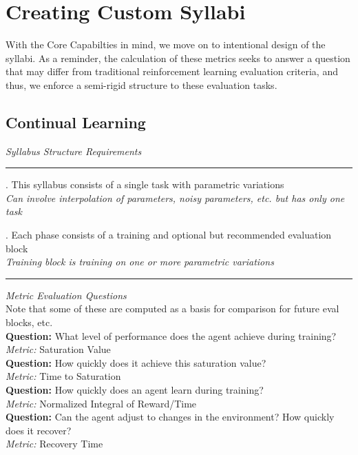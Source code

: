 \chapter{Creating Custom Syllabi}\label{ch:custom_syllabi}

With the Core Capabilties in mind, we move on to intentional design of the syllabi. As a reminder, the calculation of these metrics seeks to answer a question that may differ from traditional reinforcement learning evaluation criteria, and thus, we enforce a semi-rigid structure to these evaluation tasks.

\section{Continual Learning}    
\textit{Syllabus Structure Requirements}\\
\noindent\rule{8cm}{0.4pt}
. This syllabus consists of a single task with parametric variations\\
\textit{Can involve interpolation of parameters, noisy parameters, etc. but has only one task \\}


. Each phase consists of a training and optional but recommended evaluation block\\
\textit{Training block is training on one or more parametric variations \\}
\noindent\rule{8cm}{0.4pt}

\flushleft\textit{Metric Evaluation Questions}\\[0.1in]

Note that some of these are computed as a basis for comparison for future eval blocks, etc.\\[0.1in]

\textbf{Question:} What level of performance does the agent achieve during training?\\
\textit{Metric:} Saturation Value\\[0.1in]


\textbf{Question:} How quickly does it achieve this saturation value?\\
\textit{Metric:} Time to Saturation\\[0.1in]

\textbf{Question:} How quickly does an agent learn during training?\\
\textit{Metric:} Normalized Integral of Reward/Time\\[0.1in]


\textbf{Question:} Can the agent adjust to changes in the environment? How quickly does it recover?\\
\textit{Metric:} Recovery Time\\[0.1in]


